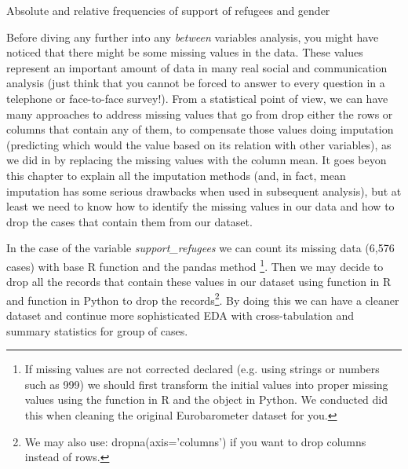 \begin{ccsexample}
\caption{Absolute and relative frequencies of support of refugees and gender}
\end{ccsexample}


Before diving any further into any \textit{between} variables analysis, you might have noticed that there might be some missing values in the data. These values represent an important amount of data in many real social and communication analysis (just think that you cannot be forced to answer to every question in a telephone or face-to-face survey!). From a statistical point of view, we can have many approaches to address missing values that go from drop either the rows or columns that contain any of them, to compensate those values doing imputation (predicting which would the value based on its relation with other variables), as we did in  by replacing the missing values with the column mean. It goes beyon this chapter to explain all the imputation methods (and, in fact, mean imputation has some serious drawbacks when used in subsequent analysis), but at least we need to know how to identify the missing values in our data and how to drop the cases that contain them from our dataset.

In the case of the variable \textit{support\_refugees} we can count its missing data (6,576 cases) with base R function  and the pandas method \footnote{If missing values are not corrected declared (e.g. using strings or numbers such as 999) we should first transform the initial values into proper missing values using the  function  in R and the  object  in Python. We conducted did this when cleaning the original Eurobarometer dataset for you.}.  Then we may decide to drop all the records that contain these values in our dataset using  function  in R and  function  in Python to drop the records\footnote{We may also use: dropna(axis='columns') if you want to drop columns instead of rows.}. By doing this we can have a cleaner dataset and continue more sophisticated EDA with cross-tabulation and summary statistics for group of cases.	


